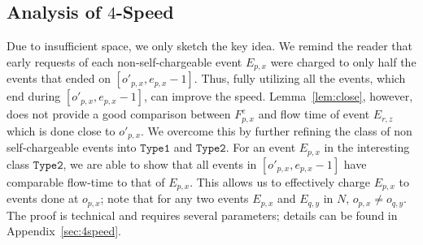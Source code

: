 \documentclass[11pt]{article}
\newtheorem{theorem}[lemma]{Theorem}
\newcommand{\one}{\texttt{Type1}}
\newcommand{\two}{\texttt{Type2}}
\newcommand{\fe}{F^e}
\begin{document}
\begin{titlepage}
\subsection{Analysis of $4$-Speed}\vspace{-2mm}
\label{sec:4speed}
Due to insufficient space, we only sketch the key idea.  We remind the
reader that early requests of each non-self-chargeable event $E_{p,x}$
were charged to only half the events that ended on $[o'_{p,x},
e_{p,x}-1]$.  Thus, fully utilizing all the events, which end during
$[o'_{p,x}, e_{p,x}-1]$, can improve the speed.
Lemma~\ref{lem:close}, however, does not provide a good comparison
between $\fe_{p,x}$ and flow time of event $E_{r,z}$ which is done
close to $o'_{p,x}$. We overcome this by further refining the class of
non self-chargeable events into $\one$ and $\two$. For an event
$E_{p,x}$ in the interesting class $\two$, we are able to show that
all events in $[o'_{p,x}, e_{p,x}-1]$ have comparable flow-time to
that of $E_{p,x}$. This allows us to effectively charge $E_{p,x}$ to
events done at $o_{p,x}$; note that for any two events $E_{p,x}$ and
$E_{q,y}$ in $N$, $o_{p,x} \neq o_{q,y}$. The proof is technical and
requires several parameters; details can be found in
Appendix~\ref{sec:4speed}.


\iffalse In this section, we further improve the speed from $5$ to $4$ in the discrete time model.
\begin{theorem}
\label{thm:4spd}
$\lwf$ is $4$-speed $O(1)$-competitive.
\end{theorem}
In Section~\ref{sec:5speed} early requests of each non-self-chargeable
event $E_{p,x}$ were charged to events that ended on roughly the last
half of $[o'_{p,x}, e_{p,x}-1]$. This is because Lemma~\ref{lem:close}
does not provide a good comparison between $\fe_{p,x}$ and flow time
of events which are done close to $o'_{p,x}$. In this section, we show
how all the events ending during $[o'_{p,x}, e_{p,x}-1]$ can be used
to pay for $\fe_{p,x}$. To do this, non-self-chargeable events in $N$
are partitioned into two disjoint sets $N_1$ and
$N_2$. For simplicity, event $E_{p,x}$ is said to have $E_{q,y}$ if $E_{q,y}$
ends during $[o'_{p,x}, e_{p,x}-1]$.  Non-self-chargeable event
$E_{p,x}$ is said to be $\one$ and in $N_1$ if it has at least $\alpha
s(e_{p,x} - o'_{p,x})$ self-chargeable events where $\alpha <1$ is
some constant to be fixed later. The rest of the events in $N$ are in
$N_2$ and said to be $\two$.  The $\one$ events can be charged to the
optimal solution because it has many self-chargeable events. For each
$\two$ event, we will bound $\fe_{p,x}$ with events which end at
$o_{p,x}$. Recall that Lemma~\ref{lem:close} cannot compare
$\fe_{p,x}$ and $F_{r,z}$, where $e_{r,z} = o'_{p,x}$. Thus we find a
\emph{bridge} events $E_{q,y}$, and compare $\fe_{p,x}$ with $F_{q,y}$
and $\fe_{q,y}$ with $F_{r,z}$, thereby $\fe_{p,x}$ with $F_{r,z}$.
\fi \vspace{-3mm}


\end{titlepage}
\end{document}

